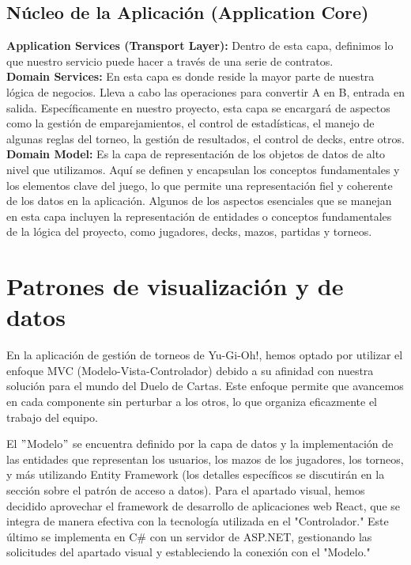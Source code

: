 \documentclass[a4paper]{article}
\begin{document}
\begin{enumerate}
\subsection{Núcleo de la Aplicación (Application Core)}
\textbf{Application Services (Transport Layer):} Dentro de esta capa, definimos lo que
nuestro servicio puede hacer a través de una serie de contratos.\\
\textbf{Domain Services:} En esta capa es donde reside la mayor parte de nuestra lógica
de negocios. Lleva a cabo las operaciones para convertir A en B, entrada en salida.
Específicamente en nuestro proyecto, esta capa se encargará de aspectos como la
gestión de emparejamientos, el control de estadísticas, el manejo de algunas reglas
del torneo, la gestión de resultados, el control de decks, entre otros.\\
\textbf{Domain Model:} Es la capa de representación de los objetos de datos de alto nivel
que utilizamos. Aquí se definen y encapsulan los conceptos fundamentales y los
elementos clave del juego, lo que permite una representación fiel y coherente de los
datos en la aplicación. Algunos de los aspectos esenciales que se manejan en esta
capa incluyen la representación de entidades o conceptos fundamentales de la
lógica del proyecto, como jugadores, decks, mazos, partidas y torneos.
\end{enumerate}
\newpage
\section{Patrones de visualizaci\'on y de datos}
En la aplicación de gestión de torneos de Yu-Gi-Oh!, hemos optado por utilizar el enfoque MVC (Modelo-Vista-Controlador) debido a su afinidad con nuestra solución para el mundo del Duelo de Cartas. Este enfoque permite que avancemos en cada componente sin perturbar a los otros, lo que organiza eficazmente el trabajo del equipo.

El $"$Modelo$"$ se encuentra definido por la capa de datos y la implementación de las entidades que representan los usuarios, los mazos de los jugadores, los torneos, y m\'as utilizando Entity Framework (los detalles específicos se discutirán en la sección sobre el patrón de acceso a datos). Para el apartado visual, hemos decidido aprovechar el framework de desarrollo de aplicaciones web React, que se integra de manera efectiva con la tecnología utilizada en el "Controlador." Este último se implementa en C$\#$ con un servidor de ASP.NET, gestionando las solicitudes del apartado visual y estableciendo la conexión con el "Modelo."
\end{document}
